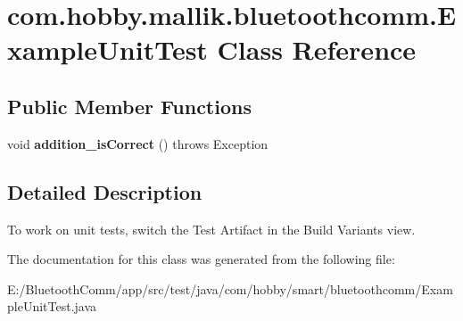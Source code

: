 \hypertarget{classcom_1_1hobby_1_1mallik_1_1bluetoothcomm_1_1_example_unit_test}{}\section{com.\+hobby.\+mallik.\+bluetoothcomm.\+Example\+Unit\+Test Class Reference}
\label{classcom_1_1hobby_1_1mallik_1_1bluetoothcomm_1_1_example_unit_test}
\subsection*{Public Member Functions}
\begin{DoxyCompactItemize}
\item 
\mbox{\label{classcom_1_1hobby_1_1mallik_1_1bluetoothcomm_1_1_example_unit_test_a914cc75a97059bb2b749e26fd2b60c66}} 
void {\bfseries addition\+\_\+is\+Correct} ()  throws Exception 
\end{DoxyCompactItemize}


\subsection{Detailed Description}
To work on unit tests, switch the Test Artifact in the Build Variants view. 

The documentation for this class was generated from the following file\+:\begin{DoxyCompactItemize}
\item 
E\+:/\+Bluetooth\+Comm/app/src/test/java/com/hobby/smart/bluetoothcomm/Example\+Unit\+Test.\+java\end{DoxyCompactItemize}

